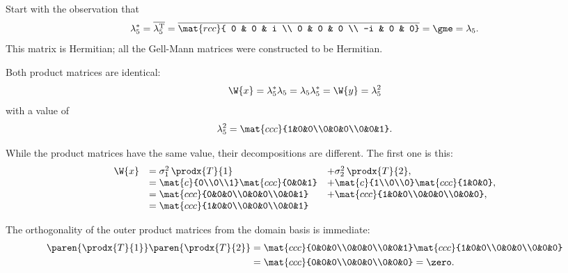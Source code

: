 Start with the observation that
\begin{equation}
  \lambda_{5}^{*} = \overline{\lambda_{5}^{\mathrm{T}}} = \overline{\mat{rcc}
{ 0 & 0 & i \\
  0 & 0 & 0 \\
 -i & 0 & 0}
} = \gme = \lambda_{5}{}.
\end{equation}
This matrix is Hermitian; all the Gell-Mann matrices were constructed to be Hermitian.

Both product matrices are identical:
\begin{equation}
  \W{x} = \lambda_{5}^{*}\lambda_{5} = \lambda_{5}\lambda_{5}^{*} = \W{y} = \lambda_{5}^{2}
\end{equation}
with a value of
\begin{equation}
  \lambda_{5}^{2} = \mat{ccc}{1&0&0\\0&0&0\\0&0&1}.
\end{equation}

While the product matrices have the same value, their decompositions are different. The first one is this:
\begin{equation}
  \begin{array}{lll}
     \W{x} &= \sigma_{1}^{2}\, \prodx{T}{1} &+ \sigma_{2}^{2}\, \prodx{T}{2},\\
      &= \mat{c}{0\\0\\1}\mat{ccc}{0&0&1} &+
         \mat{c}{1\\0\\0}\mat{ccc}{1&0&0},\\
      &= \mat{ccc}{0&0&0\\0&0&0\\0&0&1} &+
         \mat{ccc}{1&0&0\\0&0&0\\0&0&0},\\
      &= \mat{ccc}{1&0&0\\0&0&0\\0&0&1}
  \end{array}
\end{equation}

The orthogonality of the outer product matrices from the domain basis is immediate:
\begin{equation}
  \begin{split}
     \paren{\prodx{T}{1}} \paren{\prodx{T}{2}} &=
     \mat{ccc}{0&0&0\\0&0&0\\0&0&1}
     \mat{ccc}{1&0&0\\0&0&0\\0&0&0} \\
     & = \mat{ccc}{0&0&0\\0&0&0\\0&0&0} = \zero.
  \end{split}
\end{equation}

